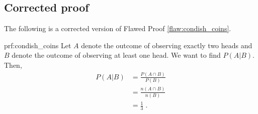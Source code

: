 \clearpage
\subsection{Corrected proof}

The following is a corrected version of Flawed Proof \ref{flaw:condish_coins}. %

\begin{prf}{prf:condish_coins} %
Let $A$ denote the outcome of observing exactly two heads and $B$ denote the outcome of observing at least one head. We want to find $P(A|B).$ Then,
\begin{align*}
    P(A|B) &= \frac{P(A \cap B)}{P(B)} \\
    &= \frac{n(A \cap B)}{n(B)} \\
    &= \frac{1}{3}\;.
\end{align*}
\end{prf}
